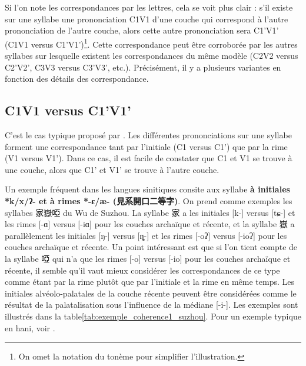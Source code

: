 \documentclass{scrbook}
\newcounter{c}[subsubsection]
\newcommand{\difwenbai}{couches archaïque et récente\xspace}
\newcommand{\illustre}{Les exemples sont illustrés dans la table\xspace}
\newcommand{\termyyx}[1]{\textbf{#1}}
\begin{document}
\begin{sloppypar}
Si l'on note les correspondances par les lettres, cela se voit plus clair : s'il existe sur une syllabe une prononciation C1V1 d'une couche qui correspond à l'autre prononciation de l'autre couche, alors cette autre prononciation sera C1'V1' (C1V1 versus C1'V1')\footnote{On omet la notation du tonème pour simplifier l'illustration.}. Cette correspondance peut être corroborée par les autres syllabes sur lesquelle existent les correspondances du même modèle (C2V2 versus C2'V2', C3V3 versus C3'V3', etc.). Précisément, il y a plusieurs variantes en fonction des détails des correspondance. 

\subsection{C1V1 versus C1'V1'}\label{coherence1}
C'est le cas typique proposé par \textcite[15]{Sagart2001hani}. Les différentes prononciations sur une syllabe forment une correspondance tant par l'initiale (C1 versus C1') que par la rime (V1 versus V1'). Dans ce cas, il est facile de constater que C1 et V1 se trouve à une couche, alors que C1' et V1' se trouve à l'autre couche.

Un exemple fréquent dans les langues sinitiques consite aux syllabe \termyyx{à initiales *k/x/ʔ- et à rimes *-ɛ/æ- (見系開口二等字)}. On prend comme exemples les syllabes 家嶽啞 du Wu de Suzhou. La syllabe 家 a les initiales [k-] versus [tɕ-] et les rimes [-ɑ] versus [-iɑ] pour les \difwenbai, et la syllabe 嶽 a parallèlement les initiales [ŋ-] versus [ȵ-] et les rimes [-oʔ] versus [-ioʔ] pour les \difwenbai. Un point intéressant est que si l'on tient compte de la syllabe 啞 qui n'a que les rimes [-o] versus [-io] pour les \difwenbai, il semble qu'il vaut mieux considérer les correspondances de ce type comme étant par la rime plutôt que par l'initiale et la rime en même temps. Les initiales alvéolo-palatales de la couche récente peuvent être considérées comme le résultat de la palatalisation sous l'influence de la médiane [-i-]. \illustre \ref{tab:exemple_coherence1_suzhou}. Pour un exemple typique en hani, voir \textcite[15]{Sagart2001hani}. 



\end{sloppypar}
\end{document}
